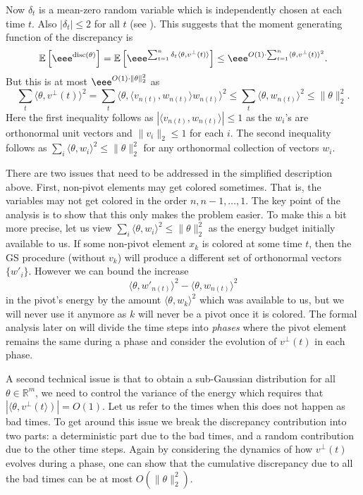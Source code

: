 \documentclass{toc}
\newcommand\E{\mathbb{E}}
\DeclareMathOperator{\disc}{disc}   %
\begin{document}
Now $\delta_t$ is a mean-zero random variable which is independently chosen at each time $t$. Also $|\delta_t|\leq 2$ for all $t$ (see ). This suggests that the moment generating function of the discrepancy is
\[
\E\left[\eee^{\disc(\theta)}\right]  = \E\left[\eee^{ \sum_{t=1}^n  \delta_t \langle  \theta, v^{\perp}(t)\rangle  }\right]
\le  \eee^{O(1) \cdot \sum_{t=1}^n \langle \theta, v^{\perp}(t) \rangle^2}.
\]
But this is at most $ \eee^{O(1) \cdot \| \theta\|_2^2}$ as
\[ \sum_t \langle \theta, v^{\perp}(t) \rangle^2  = \sum_t \langle  \theta,  \langle v_{n(t)},w_{n(t)} \rangle w_{n(t)} \rangle^2 \leq  \sum_t \langle  \theta, w_{n(t)} \rangle^2 \leq \| \theta\|_2^2.\]
Here the first inequality follows as $|\langle v_{n(t)},w_{n(t)} \rangle|\leq 1$ as the $w_i$'s are orthonormal unit vectors and $\|v_i\|_2 \leq 1$ for each $i$.
The second inequality follows as $\sum_i \langle  \theta, w_{i} \rangle^2 \leq \|\theta\|^2_2$ for any orthonormal collection of vectors $w_i$.

There are two issues that need to be addressed in the simplified description above.
First, non-pivot elements may get colored sometimes. That is, the variables may not get colored in the order $n,n-1,\ldots,1$. The key point of the analysis is to show that this only makes the problem easier. To make this a bit more precise, let us view
$\sum_i \langle  \theta, w_{i} \rangle^2 \leq \|\theta\|^2_2$  as the energy budget initially available to us. If some non-pivot element $x_k$ is colored at some time $t$, then the GS procedure (without $v_k$) will produce a different set of orthonormal vectors $\{w'_i\}$. However we can bound the increase
\[\langle \theta,w'_{n(t)} \rangle^2 - \langle \theta,w_{n(t)} \rangle^2 \]
 in the pivot's energy by the amount  $\langle  \theta, w_{k} \rangle^2$ which
was available to us, but we will never use it anymore as $k$ will never be a pivot once it is colored.
The formal analysis later on will divide the time steps into \textit{phases} where the pivot element remains the same during a phase and consider the evolution of $v^{\perp}(t)$ in each phase.

A second technical issue is that to obtain a sub-Gaussian distribution for all $\theta \in \mathbb{R}^m$, we need to control the variance of the energy which requires that $|\langle \theta, v^{\perp}(t \rangle)|=O(1)$. Let us refer to the times when this does not happen as bad times. To get around this issue we break the discrepancy contribution into two parts: a deterministic part due to the bad times, and a random contribution due to the other time steps. Again by considering the dynamics of how $v^{\perp}(t)$ evolves during a phase, one can show that the cumulative discrepancy due to all the bad times can be at most $O(\| \theta\|_2^2)$.
\end{document}
